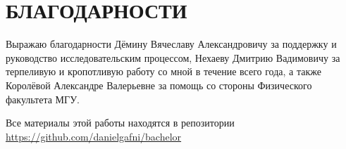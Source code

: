 \documentclass[a4paper]{article}
\begin{document}
\clearpage
 
\section*{БЛАГОДАРНОСТИ}
Выражаю благодарности Дёмину Вячеславу Александровичу за поддержку и руководство исследовательским процессом, Нехаеву Дмитрию Вадимовичу за терпеливую и кропотливую работу со мной в течение всего года, а также Королёвой Александре Валерьевне за помощь со стороны Физического факультета МГУ.

\clearpage 

\printbibliography[sorting=none,heading=bibintoc,type=article,title={СПИСОК ИСПОЛЬЗОВАННОЙ ЛИТЕРАТУРЫ}]
 
\begin{center}
Все материалы этой работы находятся в репозитории\\
\href{https://github.com/danielgafni/bachelor}{https://github.com/danielgafni/bachelor} 
\end{center}
\end{document}
